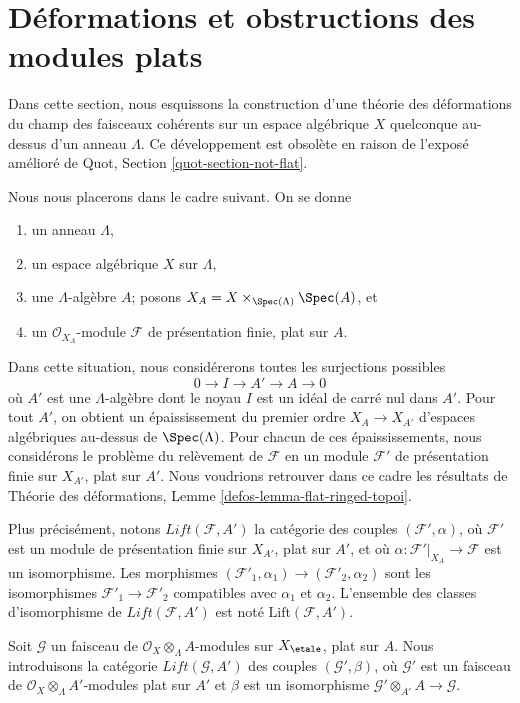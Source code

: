 \section{D\'eformations et obstructions des modules plats}
\label{section-modules}

\noindent
Dans cette section, nous esquissons la construction d'une th\'eorie des
d\'eformations du champ des faisceaux coh\'erents sur un espace alg\'ebrique
$X$ quelconque au-dessus d'un anneau $\Lambda$. Ce d\'eveloppement est
obsol\`ete en raison de l'expos\'e am\'elior\'e de
Quot, Section \ref{quot-section-not-flat}.

\medskip\noindent
Nous nous placerons dans le cadre suivant. On se donne
\begin{enumerate}
\item un anneau $\Lambda$,
\item un espace alg\'ebrique $X$ sur $\Lambda$,
\item une $\Lambda$-alg\`ebre $A$; posons
$X_A = X \times_{\Spec(\Lambda)} \Spec(A)$, et
\item un $\mathcal{O}_{X_A}$-module $\mathcal{F}$ de pr\'esentation finie,
plat sur $A$.
\end{enumerate}
Dans cette situation, nous consid\'ererons toutes les surjections possibles
$$
0 \to I \to A' \to A \to 0
$$
o\`u $A'$ est une $\Lambda$-alg\`ebre dont le noyau $I$ est un id\'eal de carr\'e
nul dans $A'$. Pour tout $A'$, on obtient un \'epaississement du premier
ordre $X_A \to X_{A'}$ d'espaces alg\'ebriques au-dessus de
$\Spec(\Lambda)$. Pour chacun de ces \'epaississements, nous consid\'erons le
probl\`eme du rel\`evement de $\mathcal{F}$ en un module $\mathcal{F}'$ de
pr\'esentation finie sur $X_{A'}$, plat sur $A'$. Nous voudrions retrouver
dans ce cadre les r\'esultats de Th\'eorie des d\'eformations, Lemme
\ref{defos-lemma-flat-ringed-topoi}.

\medskip\noindent
Plus pr\'ecis\'ement, notons $\textit{Lift}(\mathcal{F}, A')$ la cat\'egorie
des couples $(\mathcal{F}', \alpha)$, o\`u $\mathcal{F}'$ est un module de
pr\'esentation finie sur $X_{A'}$, plat sur $A'$, et o\`u
$\alpha : \mathcal{F}'|_{X_A} \to \mathcal{F}$ est un isomorphisme.
Les morphismes $(\mathcal{F}'_1, \alpha_1) \to (\mathcal{F}'_2, \alpha_2)$
sont les isomorphismes $\mathcal{F}'_1 \to \mathcal{F}'_2$ compatibles avec
$\alpha_1$ et $\alpha_2$.
L'ensemble des classes d'isomorphisme de $\textit{Lift}(\mathcal{F}, A')$
est not\'e $\text{Lift}(\mathcal{F}, A')$.

\medskip\noindent
Soit $\mathcal{G}$ un faisceau de $\mathcal{O}_X \otimes_\Lambda A$-modules
sur $X_\etale$, plat sur $A$. Nous introduisons la cat\'egorie
$\textit{Lift}(\mathcal{G}, A')$ des couples
$(\mathcal{G}', \beta)$, o\`u $\mathcal{G}'$ est un faisceau de
$\mathcal{O}_X \otimes_\Lambda A'$-modules plat sur $A'$ et $\beta$
est un isomorphisme $\mathcal{G}' \otimes_{A'} A \to \mathcal{G}$.

